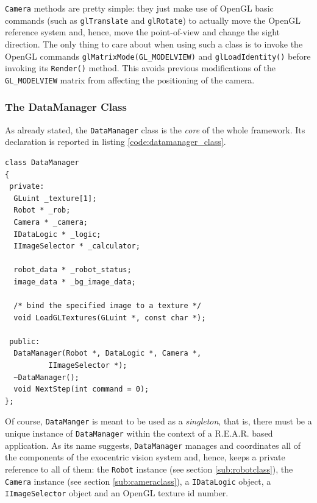 %
\texttt{Camera} methods are pretty simple: they just make 
use of OpenGL basic commands (such as \texttt{glTranslate} 
and \texttt{glRotate}) to actually move the OpenGL reference 
system and, hence, move the point-of-view and change the sight 
direction.
%
The only thing to care about when using such a class is 
to invoke the OpenGL commands \texttt{glMatrixMode(GL\_MODELVIEW)} 
and \texttt{glLoadIdentity()} before invoking its 
\texttt{Render()} method. This avoids previous modifications 
of the \texttt{GL\_MODELVIEW} matrix from affecting the 
positioning of the camera.
%

%
\subsubsection{The DataManager Class}
\label{sub:datamanager}

As already stated, the \texttt{DataManager} class is the \textit{core}
of the whole framework. Its declaration is reported in 
listing \ref{code:datamanager_class}.
%
\begin{lstlisting}[caption={\texttt{DataManager} class declaration}, label={code:datamanager_class}, frame=trBL]
class DataManager
{
 private:
  GLuint _texture[1];
  Robot * _rob;
  Camera * _camera;
  IDataLogic * _logic;
  IImageSelector * _calculator;

  robot_data * _robot_status;
  image_data * _bg_image_data;

  /* bind the specified image to a texture */
  void LoadGLTextures(GLuint *, const char *);

 public:
  DataManager(Robot *, DataLogic *, Camera *, 
	      IImageSelector *); 
  ~DataManager();
  void NextStep(int command = 0);
};
\end{lstlisting}
%
Of course, \texttt{DataManger} is meant to be used as a \textit{singleton}, 
that is, there must be a unique instance of \texttt{DataManager} 
within the context of a \textsf{R.E.A.R.} based application.
%
As its name suggests, \texttt{DataManager} manages and coordinates 
all of the components of the exocentric vision system and, hence, 
keeps a private reference to all of them: 
the \texttt{Robot} instance (see section \ref{sub:robotclass}), the 
\texttt{Camera} instance (see section \ref{sub:cameraclass}),
a \texttt{IDataLogic} object, a \texttt{IImageSelector} 
object and an OpenGL texture id number.
%

